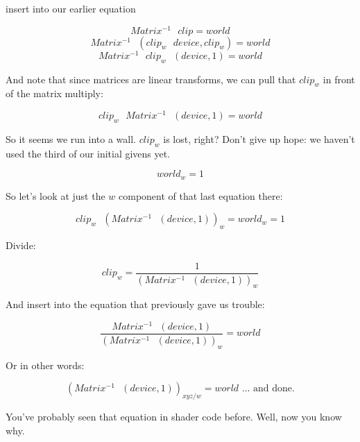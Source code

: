 \documentclass{article}
\begin{document}
insert into our earlier equation

$$Matrix^{-1}\text{ }clip = world$$
$$Matrix^{-1}\text{ }(clip_w\text{ }device, clip_w) = world$$
$$Matrix^{-1}\text{ }clip_w\text{ }(device, 1) = world$$

And note that since matrices are linear transforms, we can pull that $clip_w$ in front of the matrix multiply:

$$clip_w\text{ }Matrix^{-1}\text{ }(device, 1) = world$$

So it seems we run into a wall. $clip_w$ is lost, right? Don't give up hope: we haven't used the
third of our initial givens yet.

$$world_w = 1$$

So let's look at just the $w$ component of that last equation there:

$$clip_w\text{ }\left(Matrix^{-1}\text{ }(device, 1)\right)_w = world_w = 1$$

Divide:

$$clip_w = \frac 1 {\left(Matrix^{-1}\text{ }(device, 1)\right)_w}$$

And insert into the equation that previously gave us trouble:

$$\frac{Matrix^{-1}\text{ }(device, 1)}{\left(Matrix^{-1}\text{ }(device, 1)\right)_w} = world$$

Or in other words:

$$\left(Matrix^{-1}\text{ }(device, 1)\right)_{xyz/w} = world\text{ ... and done.}$$

You've probably seen that equation in shader code before. Well, now you know why.
\end{document}
